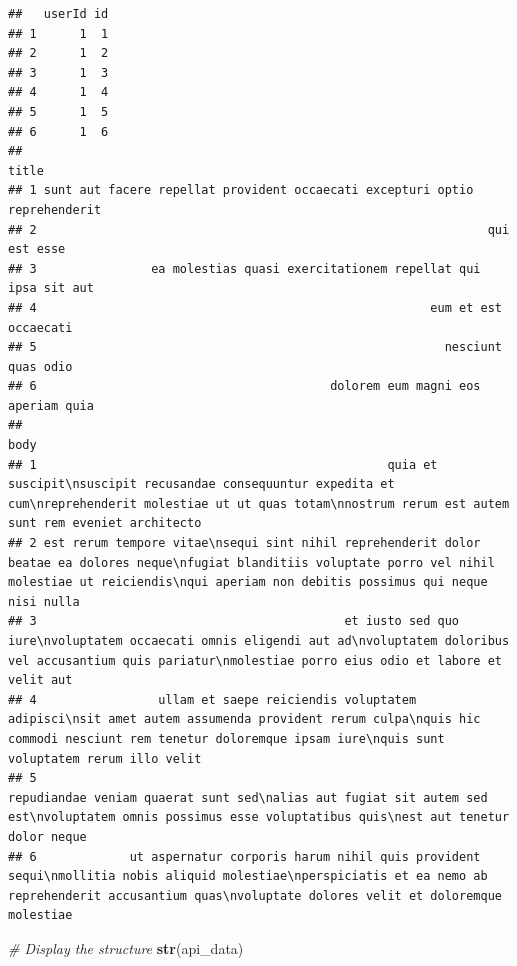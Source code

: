 \documentclass[
]{article}
\newenvironment{Shaded}{\begin{snugshade}}{\end{snugshade}}
\newcommand{\CommentTok}[1]{\textcolor[rgb]{0.56,0.35,0.01}{\textit{#1}}}
\newcommand{\FunctionTok}[1]{\textcolor[rgb]{0.13,0.29,0.53}{\textbf{#1}}}
\newcommand{\NormalTok}[1]{#1}
\begin{document}
\begin{verbatim}
##   userId id
## 1      1  1
## 2      1  2
## 3      1  3
## 4      1  4
## 5      1  5
## 6      1  6
##                                                                        title
## 1 sunt aut facere repellat provident occaecati excepturi optio reprehenderit
## 2                                                               qui est esse
## 3                ea molestias quasi exercitationem repellat qui ipsa sit aut
## 4                                                       eum et est occaecati
## 5                                                         nesciunt quas odio
## 6                                         dolorem eum magni eos aperiam quia
##                                                                                                                                                                                                                body
## 1                                                 quia et suscipit\nsuscipit recusandae consequuntur expedita et cum\nreprehenderit molestiae ut ut quas totam\nnostrum rerum est autem sunt rem eveniet architecto
## 2 est rerum tempore vitae\nsequi sint nihil reprehenderit dolor beatae ea dolores neque\nfugiat blanditiis voluptate porro vel nihil molestiae ut reiciendis\nqui aperiam non debitis possimus qui neque nisi nulla
## 3                                           et iusto sed quo iure\nvoluptatem occaecati omnis eligendi aut ad\nvoluptatem doloribus vel accusantium quis pariatur\nmolestiae porro eius odio et labore et velit aut
## 4                 ullam et saepe reiciendis voluptatem adipisci\nsit amet autem assumenda provident rerum culpa\nquis hic commodi nesciunt rem tenetur doloremque ipsam iure\nquis sunt voluptatem rerum illo velit
## 5                                                            repudiandae veniam quaerat sunt sed\nalias aut fugiat sit autem sed est\nvoluptatem omnis possimus esse voluptatibus quis\nest aut tenetur dolor neque
## 6             ut aspernatur corporis harum nihil quis provident sequi\nmollitia nobis aliquid molestiae\nperspiciatis et ea nemo ab reprehenderit accusantium quas\nvoluptate dolores velit et doloremque molestiae
\end{verbatim}

\begin{Shaded}
\begin{Highlighting}[]
\CommentTok{\# Display the structure}
\FunctionTok{str}\NormalTok{(api\_data)}
\end{Highlighting}
\end{Shaded}
\end{document}
